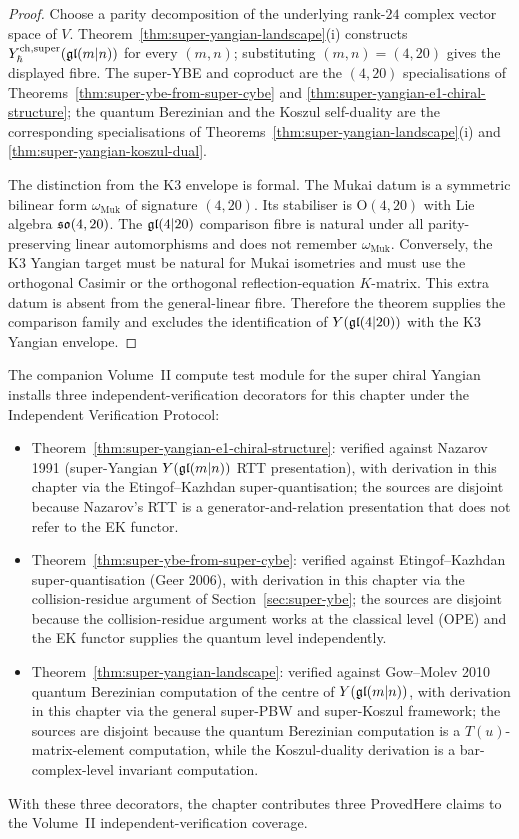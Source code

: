 \begin{proof}
Choose a parity decomposition of the underlying rank-$24$ complex
vector space of $V$. Theorem~\ref{thm:super-yangian-landscape}(i)
constructs $Y^{\mathrm{ch},\mathrm{super}}_{\hbar}(\mathfrak{gl}(m|n))$ for every $(m,n)$; substituting
$(m,n)=(4,20)$ gives the displayed fibre. The super-YBE and coproduct
are the $(4,20)$ specialisations of
Theorems~\ref{thm:super-ybe-from-super-cybe} and
\ref{thm:super-yangian-e1-chiral-structure}; the quantum Berezinian
and the Koszul self-duality are the corresponding specialisations of
Theorems~\ref{thm:super-yangian-landscape}(i) and
\ref{thm:super-yangian-koszul-dual}.

The distinction from the K3 envelope is formal. The Mukai datum is a
symmetric bilinear form $\omega_{\mathrm{Muk}}$ of signature $(4,20)$.
Its stabiliser is $\mathrm{O}(4,20)$ with Lie algebra $\mathfrak{so}(4,20)$.
The $\mathfrak{gl}(4|20)$ comparison fibre is natural under all
parity-preserving linear automorphisms and does not remember
$\omega_{\mathrm{Muk}}$. Conversely, the K3 Yangian target must be
natural for Mukai isometries and must use the orthogonal Casimir or the
orthogonal reflection-equation $K$-matrix. This extra datum is absent
from the general-linear fibre. Therefore the theorem supplies the
comparison family and excludes the identification of
$Y(\mathfrak{gl}(4|20))$ with the K3 Yangian envelope.
\end{proof}

\begin{remark}
\label{rem:iv-decorator}
The companion Volume~II compute test module for the super chiral
Yangian installs three independent-verification decorators for this
chapter under the Independent Verification Protocol:
\begin{itemize}
\item Theorem~\ref{thm:super-yangian-e1-chiral-structure}: verified
 against Nazarov 1991 (super-Yangian $Y(\mathfrak{gl}(m|n))$ RTT presentation),
 with derivation in this chapter via the Etingof--Kazhdan
 super-quantisation; the sources are disjoint because Nazarov's RTT is
 a generator-and-relation presentation that does not refer to the EK
 functor.
\item Theorem~\ref{thm:super-ybe-from-super-cybe}: verified against
 Etingof--Kazhdan super-quantisation (Geer 2006), with derivation in
 this chapter via the collision-residue argument of
 Section~\ref{sec:super-ybe}; the sources are disjoint because the
 collision-residue argument works at the classical level (OPE) and
 the EK functor supplies the quantum level independently.
\item Theorem~\ref{thm:super-yangian-landscape}: verified against
 Gow--Molev 2010 quantum Berezinian computation of the centre of
 $Y(\mathfrak{gl}(m|n))$, with derivation in this chapter via the general
 super-PBW and super-Koszul framework; the sources are disjoint
 because the quantum Berezinian computation is a $T(u)$-matrix-element
 computation, while the Koszul-duality derivation is a
 bar-complex-level invariant computation.
\end{itemize}
With these three decorators, the chapter contributes three ProvedHere
claims to the Volume~II independent-verification coverage.
\end{remark}

